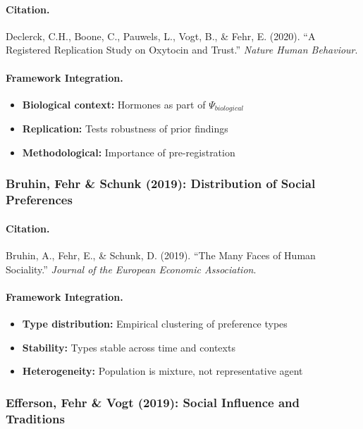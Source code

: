 \paragraph{Citation.}
Declerck, C.H., Boone, C., Pauwels, L., Vogt, B., \& Fehr, E. (2020).
``A Registered Replication Study on Oxytocin and Trust.''
\emph{Nature Human Behaviour}.

\paragraph{Framework Integration.}
\begin{itemize}
  \item \textbf{Biological context:} Hormones as part of $\Psi_{biological}$
  \item \textbf{Replication:} Tests robustness of prior findings
  \item \textbf{Methodological:} Importance of pre-registration
\end{itemize}

\subsubsection{Bruhin, Fehr \& Schunk (2019): Distribution of Social Preferences}

\paragraph{Citation.}
Bruhin, A., Fehr, E., \& Schunk, D. (2019).
``The Many Faces of Human Sociality.''
\emph{Journal of the European Economic Association}.

\paragraph{Framework Integration.}
\begin{itemize}
  \item \textbf{Type distribution:} Empirical clustering of preference types
  \item \textbf{Stability:} Types stable across time and contexts
  \item \textbf{Heterogeneity:} Population is mixture, not representative agent
\end{itemize}

\subsubsection{Efferson, Fehr \& Vogt (2019): Social Influence and Traditions}

